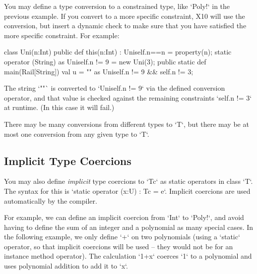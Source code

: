 You may define a type conversion to a constrained type, like \xcd`Poly!` in
the previous example.   If you convert to a more specific constraint, X10 will use
the conversion, but insert a dynamic check to make sure that you have
satisfied the more specific constraint.  For example: 
\begin{xten}
class Uni(n:Int) {
  public def this(n:Int) : Uni{self.n==n} = {property(n);}
  static operator (String) as Uni{self.n != 9} = new Uni(3);
  public static def main(Rail[String]) {
    val u = "" as Uni{self.n != 9 && self.n != 3};
  }
}
\end{xten}
%
The string \xcd`""` is converted to \xcd`Uni{self.n != 9}` via the defined
conversion operator, and that value is checked against the remaining
constraints \xcd`{self.n != 3}` at runtime.  (In this case it will fail.)

There may be many conversions from different types to \xcd`T`, but there may
be at most one conversion from any given type to \xcd`T`. 


\subsection{Implicit Type Coercions}

You may also define {\em implicit} type coercions to \xcd`T{c}` as static
operators in class \xcd`T`.  The syntax for this is
\xcd`static operator (x:U) : T{c} = e`.
Implicit coercions are used automatically by the compiler.  

For example, we can define an implicit coercion from \xcd`Int` to \xcd`Poly!`,
and avoid having to define the sum of an integer and a polynomial
as many special cases.  In the following example, we only define \xcd`+` on
two polynomials (using a \xcd`static` operator, so that implicit coercions
will be used -- they would not be for an instance method operator).  The
calculation \xcd`1+x` coerces \xcd`1` to a polynomial and uses polynomial
addition to add it to \xcd`x`.



